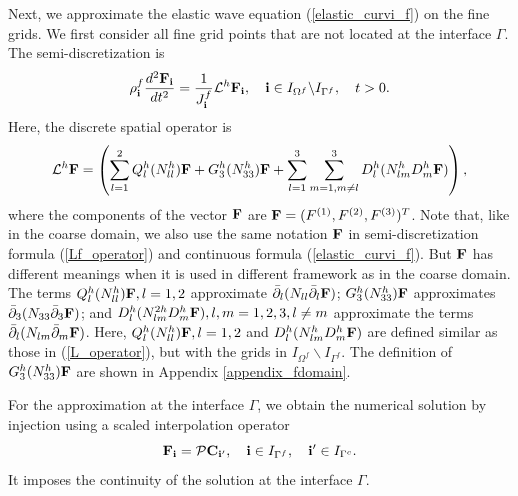 Next, we approximate the elastic wave equation (\ref{elastic_curvi_f}) on the fine grids. We first consider all fine grid points that are not located at the interface $\Gamma$. The semi-discretization  is
\begin{equation}\label{elastic_semi_f}
{\rho}_{\bf i}^{f}\frac{d^2{{\bf F}_{\bf i}}}{dt^2} = \frac{1}{J^f_{\bf i}}{\mathcal{L}}^{h} {{\bf F}}_{\bf i},\quad {\bf i}\in I_{\Omega^f}\backslash I_{{\Gamma^f}},\quad t>0.
\end{equation}
Here, the discrete spatial operator is
\begin{equation}\label{Lf_operator}
{\mathcal{L}}^{h} {{\bf F}} = \left(\sum_{l=1}^2{Q}_l^{h}({N}_{ll}^h){\bf F}+{G}_3^{h}({N}_{33}^h){\bf F}+\sum_{l=1}^3\sum_{m=1,m\neq l}^3{D}_l^{h}({N}_{lm}^{h}{D}_m^{h}{\bf F})\right),
\end{equation}
where the components of the vector ${\bf F}$ are ${\bf F} = (F^{(1)}, F^{(2)}, F^{(3)})^T$. Note that, like in the coarse domain, we also use the same notation ${\bf F}$ in semi-discretization formula (\ref{Lf_operator}) and continuous formula (\ref{elastic_curvi_f}). But ${\bf F}$ has different meanings when it is used in different framework as in the coarse domain. The terms $Q_l^{h}(N_{ll}^{h}){\bf F}, l = 1,2$ approximate $\bar{\partial}_l(N_{ll}\bar{\partial}_l{\bf F})$; ${G}_3^{h}(N_{33}^{h}){\bf F}$ approximates $\bar{\partial}_3(N_{33}\bar{\partial}_3 {\bf F})$; and $D_{l}^{h}(N_{lm}^{2h}D_m^{h}{\bf F}), l,m = 1,2,3, l\neq m$ approximate the terms $\bar{\partial}_l(N_{lm}\bar{\partial}_m {\bf F})$. Here, ${Q}_l^{h}({N}_{ll}^h){\bf F}, l = 1,2$ and ${D}_l^{h}({N}_{lm}^{h}{D}_m^{h}{\bf F})$ are defined similar as those in (\ref{L_operator}), but with the grids in $I_{\Omega^f}\backslash I_{{\Gamma^f}}$. The definition of ${{G}}_3^{h}({N}_{33}^{h}){\bf F}$ are shown in Appendix \ref{appendix_fdomain}.

For the approximation at the interface $\Gamma$, we obtain the numerical solution by injection using a scaled interpolation operator
\begin{equation}\label{continuous_sol}
{\bf F}_{\bf i} = {\mathcal{P}}{\bf C}_{{\bf i}'},\quad {\bf i}\in I_{\Gamma^f},\quad {{\bf i}'}\in I_{\Gamma^c}.
\end{equation}
It imposes the continuity of the solution at the interface $\Gamma$. 

